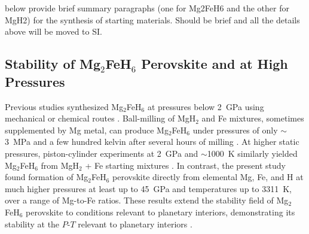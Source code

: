 \documentclass[draft,jgrga,12pt]{agujournal2019}
\begin{document}
\section{}

\subsection{}

\begin{cbox}
    below provide brief summary paragraphs (one for Mg2FeH6 and the other for MgH2) for the synthesis of starting materials.  Should be brief and all the details above will be moved to SI.
\end{cbox}



\subsection{Stability of Mg$_2$FeH$_6$ Perovskite and  at High Pressures}

Previous studies synthesized Mg$_2$FeH$_6$ at pressures below 2~{GPa} using mechanical or chemical routes \cite{george_bulk_2009,polanski_mg2feh6_2019, lang_insitu_2017,retuerto_highpressure_2010, retuerto_neutron_2015}.
Ball-milling of MgH$_2$ and Fe mixtures, sometimes supplemented by Mg metal, can produce Mg$_2$FeH$_6$ under pressures of only $\sim$3~{MPa} and a few hundred kelvin after several hours of milling \cite{george_bulk_2009,polanski_mg2feh6_2019, lang_insitu_2017}.
At higher static pressures, piston-cylinder experiments at 2~GPa and $\sim$1000~K similarly yielded Mg$_2$FeH$_6$ from MgH$_2$ + Fe starting mixtures \cite{retuerto_highpressure_2010, retuerto_neutron_2015}.
In contrast, the present study found formation of Mg$_2$FeH$_6$ perovskite directly from elemental Mg, Fe, and H at much higher pressures at least up to 45~{GPa} and temperatures up to 3311~K, over a range of Mg-to-Fe ratios. 
These results extend the stability field of Mg$_2$FeH$_6$ perovskite to conditions relevant to planetary interiors, demonstrating its stability at the $P$-$T$ relevant to planetary interiors \cite{asselli_formation_2013,puszkiel_new_2018}.
\end{document}
